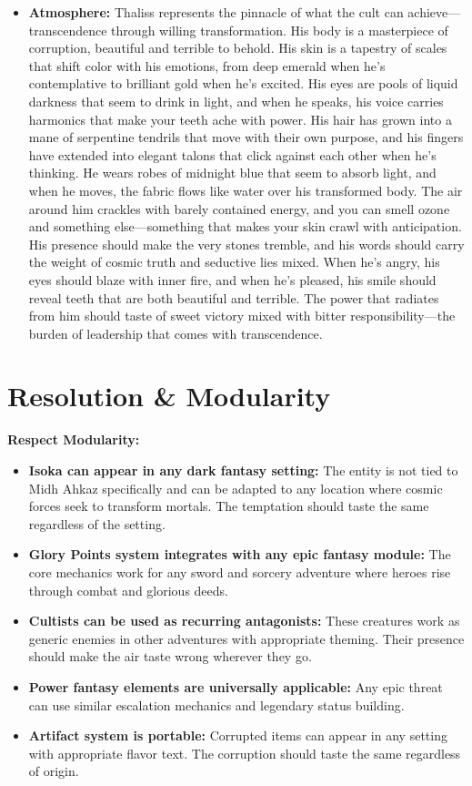 \documentclass[11pt]{article}
\begin{document}
\begin{itemize}
\begin{itemize}
\begin{itemize}
  \item \textbf{Atmosphere:} Thaliss represents the pinnacle of what the cult can achieve—transcendence through willing transformation. His body is a masterpiece of corruption, beautiful and terrible to behold. His skin is a tapestry of scales that shift color with his emotions, from deep emerald when he's contemplative to brilliant gold when he's excited. His eyes are pools of liquid darkness that seem to drink in light, and when he speaks, his voice carries harmonics that make your teeth ache with power. His hair has grown into a mane of serpentine tendrils that move with their own purpose, and his fingers have extended into elegant talons that click against each other when he's thinking. He wears robes of midnight blue that seem to absorb light, and when he moves, the fabric flows like water over his transformed body. The air around him crackles with barely contained energy, and you can smell ozone and something else—something that makes your skin crawl with anticipation. His presence should make the very stones tremble, and his words should carry the weight of cosmic truth and seductive lies mixed. When he's angry, his eyes should blaze with inner fire, and when he's pleased, his smile should reveal teeth that are both beautiful and terrible. The power that radiates from him should taste of sweet victory mixed with bitter responsibility—the burden of leadership that comes with transcendence.
  \end{itemize}
\end{itemize}

\section{Resolution \& Modularity}

\textbf{Respect Modularity:}
\begin{itemize}
\item \textbf{Isoka can appear in any dark fantasy setting:} The entity is not tied to Midh Ahkaz specifically and can be adapted to any location where cosmic forces seek to transform mortals. The temptation should taste the same regardless of the setting.
\item \textbf{Glory Points system integrates with any epic fantasy module:} The core mechanics work for any sword and sorcery adventure where heroes rise through combat and glorious deeds.
\item \textbf{Cultists can be used as recurring antagonists:} These creatures work as generic enemies in other adventures with appropriate theming. Their presence should make the air taste wrong wherever they go.
\item \textbf{Power fantasy elements are universally applicable:} Any epic threat can use similar escalation mechanics and legendary status building.
\item \textbf{Artifact system is portable:} Corrupted items can appear in any setting with appropriate flavor text. The corruption should taste the same regardless of origin.
\end{itemize}


\end{itemize}
\end{document}
